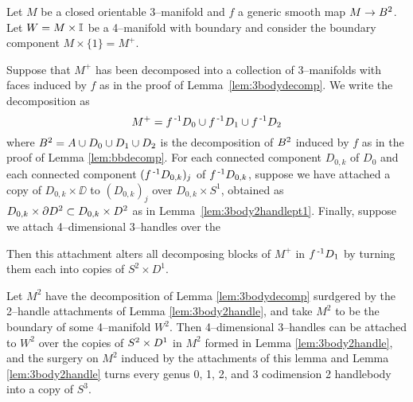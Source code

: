 \begin{lem}
	\label{lem:3body3handle}
	Let $M$ be a closed orientable 3--manifold and $f$ a generic smooth map $M\to B^2$.
	Let $W=M\times\mathbb{I}$ be a 4--manifold with boundary and consider the boundary component $M\times\{1\}=M^+$.
	
	Suppose that $M^+$ has been decomposed into a collection of 3--manifolds with faces induced by $f$ as in the proof of Lemma~\ref{lem:3bodydecomp}.
	We write the decomposition as
	\[
		M^+ = f^{\,\text{-}1} D_0\cup f^{\,\text{-}1} D_1\cup f^{\,\text{-}1} D_2
	\]
	where $B^2=A\cup D_0\cup D_1\cup D_2$ is the decomposition of $B^2$ induced by $f$ as in the proof of Lemma \ref{lem:bbdecomp}.	
	For each connected component $D_{0,k}$ of $D_0$ and each connected component $(f^{\,\text{-}1} D_{0,k})_j$ of $f^{\,\text{-}1} D_{0,k}$, suppose we have attached a copy of $D_{0,k}\times\DD$ to $(D_{0,k})_j$ over $D_{0,k}\times S^1$, obtained as $D_{0,k}\times \partial D^2\subset D_{0,k}\times D^2$ as in Lemma~\ref{lem:3body2handlept1}.
	Finally, suppose we attach 4--dimensional 3--handles over the 
	
	
	
	
	
	Then this attachment alters all decomposing blocks of $M^+$ in $f^{\,\text{-}1} D_1$ by turning them each into copies of $S^2\times D^1$.
\end{lem}
















\begin{lem}
	Let $M^2$ have the decomposition of Lemma \ref{lem:3bodydecomp} surdgered by the 2--handle attachments of Lemma \ref{lem:3body2handle}, and take $M^2$ to be the boundary of some 4--manifold $W^2$.
	Then 4--dimensional 3--handles can be attached to $W^2$ over the copies of $S^2\times D^1$ in $M^2$ formed in Lemma \ref{lem:3body2handle}, and the surgery on $M^2$ induced by the attachments of this lemma and Lemma \ref{lem:3body2handle} turns every genus 0, 1, 2, and 3 codimension 2 handlebody into a copy of $S^3$.
\end{lem}

